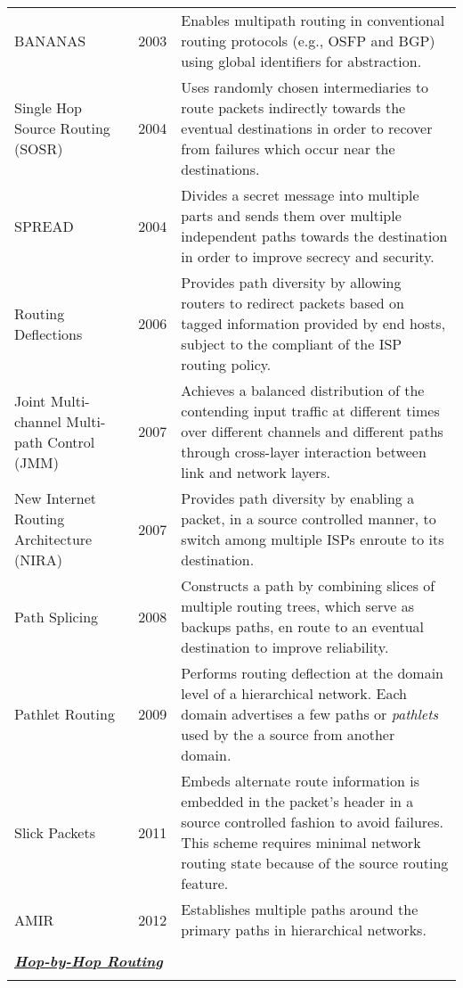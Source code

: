 \documentclass[10pt]{IEEEtran}
\begin{document}
\begin{table*}[!ht]
\begin{tabular}{p{5.5cm}p{1cm}p{10cm}}
BANANAS \cite{kaur2003bananas} & 2003 & Enables multipath routing in conventional routing protocols (e.g., OSFP and BGP) using global identifiers for abstraction.\\
Single Hop Source Routing (SOSR) \cite{gummadi2004improving} & 2004	 & Uses randomly chosen intermediaries to route packets indirectly towards the eventual destinations in order to recover from failures which occur near the destinations. \\
SPREAD \cite{lou2004spread} & 2004	 & Divides a secret message into multiple parts and sends them over multiple independent paths towards the destination in order to improve secrecy and security. \\
Routing Deflections \cite{yang2006source} & 2006 & Provides path diversity by allowing routers to redirect packets based on tagged information provided by end hosts, subject to the compliant of the ISP routing policy.  \\
Joint Multi-channel Multi-path Control (JMM)  \cite{tam2007joint} & 2007 & Achieves a balanced distribution of the contending input traffic at different times over different channels and different paths through cross-layer interaction between link and network layers. \\
New Internet Routing Architecture (NIRA) \cite{yang2007nira} & 2007 & Provides path diversity by enabling a packet, in a source controlled manner, to switch among multiple ISPs enroute to its destination.   \\
Path Splicing \cite{motiwala2008path} & 2008 & Constructs a path by combining slices of multiple routing trees, which serve as backups paths, en route to an eventual destination to improve reliability. \\
Pathlet Routing \cite{godfrey2009pathlet} & 2009 & Performs routing deflection at the domain level of a hierarchical network. Each domain advertises a few paths or \textit{pathlets} used by the a source from another domain. \\
Slick Packets \cite{nguyen2011slick} & 2011	&  Embeds alternate route information is embedded in the packet's header in a source controlled fashion to avoid failures. This scheme requires minimal network routing state because of the source routing feature. \\
AMIR \cite{qin2012amir} & 2012	& Establishes multiple paths around the primary paths in hierarchical networks. \\

\\
\multicolumn{2}{l}{\textbf{\underline{\emph{Hop-by-Hop Routing}}}}\\
\\


\end{tabular}
\end{table*}
\end{document}
